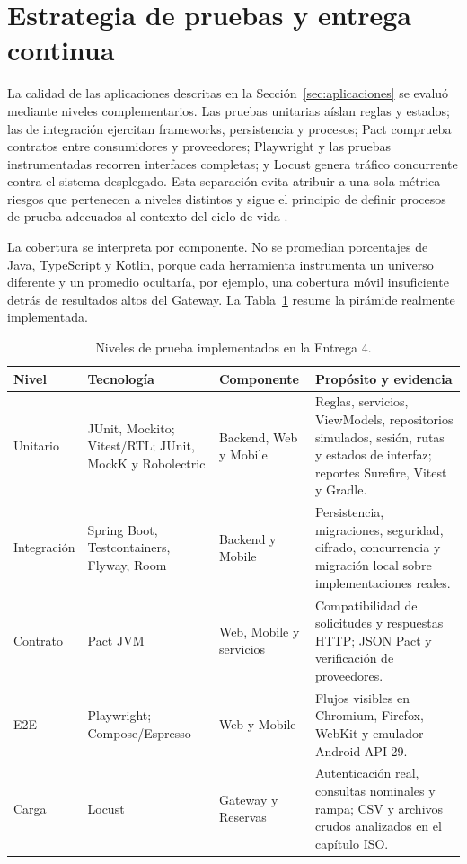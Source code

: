 \section{Estrategia de pruebas y entrega continua}
\label{sec:pruebas-cicd}

La calidad de las aplicaciones descritas en la
Sección~\ref{sec:aplicaciones} se evaluó mediante niveles complementarios. Las
pruebas unitarias aíslan reglas y estados; las de integración ejercitan
frameworks, persistencia y procesos; Pact comprueba contratos entre
consumidores y proveedores; Playwright y las pruebas instrumentadas recorren
interfaces completas; y Locust genera tráfico concurrente contra el sistema
desplegado. Esta separación evita atribuir a una sola métrica riesgos que
pertenecen a niveles distintos y sigue el principio de definir procesos de
prueba adecuados al contexto del ciclo de vida \cite{iso29119_2_2021}.

La cobertura se interpreta por componente. No se promedian porcentajes de Java,
TypeScript y Kotlin, porque cada herramienta instrumenta un universo diferente
y un promedio ocultaría, por ejemplo, una cobertura móvil insuficiente detrás de
resultados altos del Gateway. La Tabla~\ref{tab:piramide-pruebas} resume la
pirámide realmente implementada.

\begin{table}[t]
  \centering
  \small
  \caption{Niveles de prueba implementados en la Entrega 4.}
  \label{tab:piramide-pruebas}
  \begin{tabular}{|p{}|p{}|p{}|p{}|}
    \hline
    \textbf{Nivel} & \textbf{Tecnología} & \textbf{Componente} & \textbf{Propósito y evidencia} \\
    \hline
    Unitario & JUnit, Mockito; Vitest/RTL; JUnit, MockK y Robolectric & Backend, Web y Mobile & Reglas, servicios, ViewModels, repositorios simulados, sesión, rutas y estados de interfaz; reportes Surefire, Vitest y Gradle. \\
    \hline
    Integración & Spring Boot, Testcontainers, Flyway, Room & Backend y Mobile & Persistencia, migraciones, seguridad, cifrado, concurrencia y migración local sobre implementaciones reales. \\
    \hline
    Contrato & Pact JVM & Web, Mobile y servicios & Compatibilidad de solicitudes y respuestas HTTP; JSON Pact y verificación de proveedores. \\
    \hline
    E2E & Playwright; Compose/Espresso & Web y Mobile & Flujos visibles en Chromium, Firefox, WebKit y emulador Android API 29. \\
    \hline
    Carga & Locust & Gateway y Reservas & Autenticación real, consultas nominales y rampa; CSV y archivos crudos analizados en el capítulo ISO. \\
    \hline
  \end{tabular}
\end{table}

